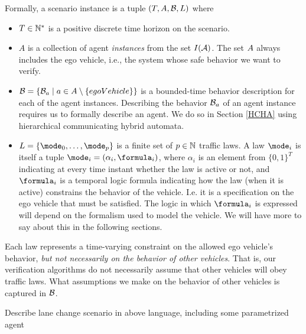 Formally, a scenario instance is a tuple $(T, A,\mathcal{B}, L)$ where
\begin{itemize}
\item $T \in \mathbb{N}^*$ is a positive discrete time horizon on the scenario.
%
\item $A$ is a collection of agent \emph{instances} from the set $I(\mathcal{A})$.
The set $A$ always includes the ego vehicle, i.e., the system whose safe behavior we want to verify.
%
\item $\mathcal{B} = \{\mathcal{B}_a \;|\; a \in A \setminus \{egoVehicle\}\}$ is a bounded-time behavior description for each of the agent instances.
Describing the behavior $\mathcal{B}_a$ of an agent instance requires us to formally describe an agent. 
We do so in Section \ref{HCHA} using hierarchical communicating hybrid automata.
%
\item $L = \{\mode_0,\ldots,\mode_p\}$ is a finite set of $p \in \mathbb{N}$ traffic laws. 
A law $\mode_i$ is itself a tuple $\mode_i = (\alpha_i,\formula_i)$, 
where $\alpha_i$ is an element from $\{0,1\}^T$ indicating at every time instant whether the law is active or not, 
and $\formula_i$ is a temporal logic formula indicating how the law (when it is active) constrains the behavior of the vehicle. 
I.e. it is a specification on the ego vehicle that must be satisfied. 
The logic in which $\formula_i$ is expressed will depend on the formalism used to model the vehicle. 
We will have more to say about this in the following sections.
\end{itemize}

Each law represents a time-varying constraint on the allowed ego vehicle's behavior, \emph{but not necessarily on the behavior of other vehicles}.
That is, our verification algorithms do not necessarily assume that other vehicles will obey traffic laws. 
What assumptions we make on the behavior of other vehicles is captured in $\mathcal{B}$.

\begin{exmp}
	Describe lane change scenario in above language, including some parametrized agent
\end{exmp}
	
%	